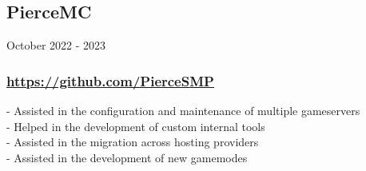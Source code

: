 \subsection{PierceMC} October 2022 - 2023 \\
\subsubsection{\href{https://github.com/PierceSMP}{https://github.com/PierceSMP}}
-\:  Assisted in the configuration and maintenance of multiple gameservers \\
-\:  Helped in the development of custom internal tools \\
-\:  Assisted in the migration across hosting providers \\
-\:  Assisted in the development of new gamemodes \\
